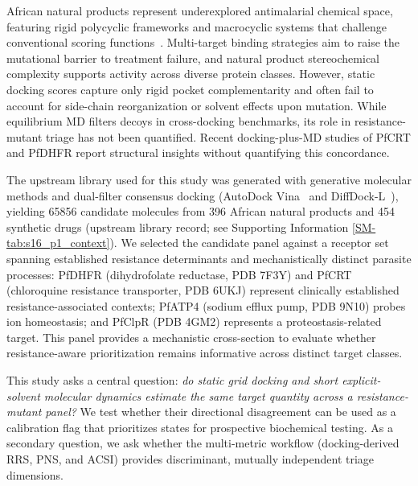 \documentclass[journal=jcisd8,manuscript=article,layout=traditional]{achemso}
\begin{document}
African natural products represent underexplored antimalarial chemical space, featuring rigid polycyclic frameworks and macrocyclic systems that challenge conventional scoring functions~\citep{ferreira2023docking}. Multi-target binding strategies aim to raise the mutational barrier to treatment failure\citep{polypharmacology_malaria_2026}, and natural product stereochemical complexity supports activity across diverse protein classes\citep{polypharmacology_malaria_2026,value_addition_african_np_2025}. However, static docking scores capture only rigid pocket complementarity and often fail to account for side-chain reorganization or solvent effects upon mutation\citep{ferreira2023docking,soares2023mdreport}. While equilibrium MD filters decoys in cross-docking benchmarks\citep{liu2017mdfilter}, its role in resistance-mutant triage has not been quantified. Recent docking-plus-MD studies of PfCRT and PfDHFR report structural insights without quantifying this concordance\citep{ghosh2025pfcrt,gogoi2026np}.

The upstream library used for this study was generated with generative molecular methods and dual-filter consensus docking (AutoDock Vina~\citep{vina_2021} and DiffDock-L~\citep{diffdock_2023}), yielding \num{65856} candidate molecules from 396 African natural products and 454 synthetic drugs (upstream library record; see Supporting Information \cref{SM-tab:s16_p1_context}). We selected the candidate panel against a receptor set spanning established resistance determinants and mechanistically distinct parasite processes: PfDHFR (dihydrofolate reductase, PDB 7F3Y) and PfCRT (chloroquine resistance transporter, PDB 6UKJ) represent clinically established resistance-associated contexts; PfATP4 (sodium efflux pump, PDB 9N10) probes ion homeostasis; and PfClpR (PDB 4GM2) represents a proteostasis-related target. This panel provides a mechanistic cross-section to evaluate whether resistance-aware prioritization remains informative across distinct target classes.

This study asks a central question: \textit{do static grid docking and short explicit-solvent molecular dynamics estimate the same target quantity across a resistance-mutant panel?} We test whether their directional disagreement can be used as a calibration flag that prioritizes states for prospective biochemical testing. As a secondary question, we ask whether the multi-metric workflow (docking-derived RRS, PNS, and ACSI) provides discriminant, mutually independent triage dimensions.
\end{document}
